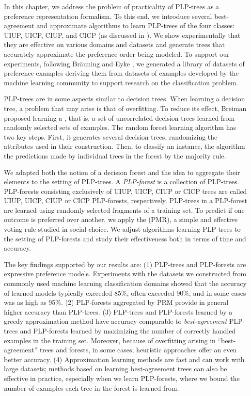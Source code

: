 In this chapter, we address the problem of practicality of PLP-trees as 
a preference representation formalism. To this end, we introduce several 
best-agreement and approximate algorithms to learn PLP-trees of the four classes:
UIUP, UICP, CIUP, and CICP (as discussed in ).
We show experimentally that they are effective on various domains
and datasets and generate trees that accurately approximate the preference 
order being modeled. To support our experiments, following Br{\"a}uning 
and Eyke \cite{brauning2012learning}, we generated a library of datasets 
of preference examples deriving them from datasets of examples developed 
by the machine learning community to support research on the classification 
problem.

PLP-trees are in some aspects similar to decision trees. 
When learning a decision tree, a problem that may arise is that of 
overfitting. To reduce its effect, Breiman \cite{breiman2001random} 
proposed learning a , that is, a set of uncorrelated 
decision trees learned from randomly selected sets of examples. The 
random forest learning algorithm \cite{breiman2001random} has two key 
steps. First, it generates several decision trees, randomizing the attributes
used in their construction. Then, to classify an instance, the algorithm 
 the predictions made by individual trees in the forest 
by the majority rule. 

We adapted both the notion of a decision forest and 
the idea to aggregate their elements to the 
setting of PLP-trees. A \emph{PLP-forest} is a collection of PLP-trees. 
PLP-forests consisting exclusively of UIUP, UICP, CIUP or CICP trees are
called UIUP, UICP, CIUP or CICP PLP-forests, respectively.
PLP-trees in a PLP-forest are learned using randomly selected  
fragments of a training set. To predict if one outcome is preferred over 
another, we apply the  (PMR), a simple and 
effective voting rule studied in social choice. We adjust algorithms 
learning PLP-trees to the setting of PLP-forests and study their 
effectiveness both in terms of time and accuracy.

The key findings supported by our results are: (1) PLP-trees and PLP-forests 
are expressive preference models. Experiments with the datasets we constructed 
from commonly used machine learning classification domains showed that the
accuracy of learned models typically exceeded 85\%, often exceeded 90\%, and 
in some cases was as high as 95\%. (2) PLP-forests aggregated by PRM provide 
in general higher accuracy than PLP-trees. (3) PLP-trees and PLP-forests 
learned by a greedy approximation method have accuracy comparable to 
\emph{best-agreement} PLP-trees and PLP-forests learned by maximizing the
number of correctly handled examples in the training set. Moreover, because of 
overfitting arising in ``best-agreement'' trees and forests, in some cases, heuristic 
approaches offer an even better accuracy. (4) Approximation learning methods 
are fast and can work with large datasets; methods based on learning 
best-agreement trees can also be effective in practice, especially when we 
learn PLP-forests, where we bound the number of examples each tree in the
forest is learned from.

